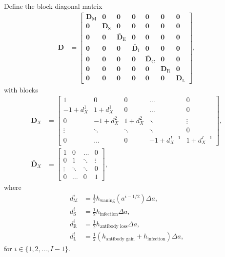 \documentclass[12pt]{article}
\newcommand{\mat}[1]{\mathbf{#1}}
\begin{document}
Define the block diagonal matrix
\begin{align}
  \mat{D} &=
  \begin{bmatrix}
    \mat{D}_{\mathrm{M}} & \mat{0} & \mat{0} &
    \mat{0} & \mat{0} & \mat{0} & \mat{0}
    \\
    \mat{0} & \mat{D}_{\mathrm{S}} & \mat{0} &
    \mat{0} & \mat{0} & \mat{0} & \mat{0}
    \\
    \mat{0} & \mat{0} & \bar{\mat{D}}_{\mathrm{E}} &
    \mat{0} & \mat{0} & \mat{0} & \mat{0}
    \\
    \mat{0} & \mat{0} & \mat{0} &
    \bar{\mat{D}}_{\mathrm{I}} & \mat{0} & \mat{0} & \mat{0}
    \\
    \mat{0} & \mat{0} & \mat{0} & \mat{0} &
    \bar{\mat{D}}_{\mathrm{C}} & \mat{0} & \mat{0}
    \\
    \mat{0} & \mat{0} & \mat{0} & \mat{0} &
    \mat{0} & \mat{D}_{\mathrm{R}} & \mat{0}
    \\
    \mat{0} & \mat{0} & \mat{0} & \mat{0} &
    \mat{0} & \mat{0} & \mat{D}_{\mathrm{L}}
  \end{bmatrix},
\end{align}
with blocks
\begin{subequations}
  \begin{align}
    \mat{D}_X &=
    \begin{bmatrix}
      1 & 0 & 0 & \hdots & 0
      \\
      - 1 + d_X^1 & 1 + d_X^1 & 0 & \hdots & 0
      \\
      0 & - 1 + d_X^2 & 1 + d_X^2 & \ddots & \vdots
      \\
      \vdots & \ddots & \ddots & \ddots & 0
      \\
      0 & \hdots & 0 & - 1 + d_X^{I - 1} & 1 + d_X^{I - 1}
    \end{bmatrix},
    \\
    \bar{\mat{D}}_X &=
    \begin{bmatrix}
      1 & 0 & \hdots & 0 \\
      0 & 1 & \ddots & \vdots \\
      \vdots & \ddots & \ddots & 0 \\
      0 & \hdots & 0 & 1
    \end{bmatrix},
  \end{align}
\end{subequations}
where
\begin{subequations}
  \begin{align}
    d_{\mathrm{M}}^i
    &= \frac{1}{2} h_{\text{waning}}(a^{i - 1 / 2})
      \Delta a,
    \\
    d_{\mathrm{S}}^i
    &= \frac{1}{2} h_{\text{infection}}
      \Delta a,
    \\
    d_{\mathrm{R}}^i
    &= \frac{1}{2} h_{\text{antibody loss}}
      \Delta a,
    \\
    d_{\mathrm{L}}^i
    &= \frac{1}{2} \left(h_{\text{antibody gain}}
      + h_{\text{infection}}\right)
      \Delta a,
  \end{align}
\end{subequations}
for $i \in \{1, 2, \ldots, I - 1\}$.
\end{document}
